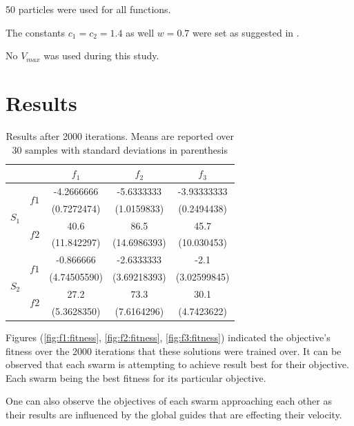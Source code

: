 \documentclass[conference]{IEEEtran}
\begin{document}
    50 particles were used for all functions. 
    
    The constants $ c_1 = c_2 = 1.4 $ as well $ w = 0.7 $ were set as suggested in \cite{vanwyk:overfitting-psoffnn}. 
    
    No $ V_{max} $ was used during this study.

\section{Results}


\begin{table}[htbp]
\caption{Results after 2000 iterations. Means are reported over 30 samples with standard deviations in parenthesis}
\begin{center}
\begin{tabular}{|c|c|c|c|c|}
\hline
& & $ f_1 $ & $ f_2 $ & $ f_3 $\\\hline
\multirow{4}{*}{$ S_1 $} &
\multirow{2}{*}{$ f1 $} &
-4.2666666 & -5.6333333 & -3.93333333\\
&&(0.7272474) & (1.0159833) & (0.2494438)\\
&\multirow{2}{*}{$ f2 $} &
40.6 & 86.5 & 45.7\\
&&(11.842297) & (14.6986393) & (10.030453)\\
\hline
\multirow{4}{*}{$ S_2 $} &
\multirow{2}{*}{$ f1 $} &
-0.866666 & -2.6333333 & -2.1\\
&&(4.74505590) & (3.69218393) & (3.02599845)\\
&\multirow{2}{*}{$ f2 $} &
27.2 & 73.3 & 30.1\\
&&(5.3628350) & (7.6164296) & (4.7423622)\\
\hline
\end{tabular}
\label{tab:glass}
\end{center}
\end{table}

Figures (\ref{fig:f1:fitness}, \ref{fig:f2:fitness}, \ref{fig:f3:fitness}) indicated the objective's fitness over the 2000 iterations that these solutions were trained over. It can be observed that each swarm is attempting to achieve result best for their objective. Each swarm being the best fitness for its particular objective.

One can also observe the objectives of each swarm approaching each other as their results are influenced by the global guides that are effecting their velocity.
\end{document}

